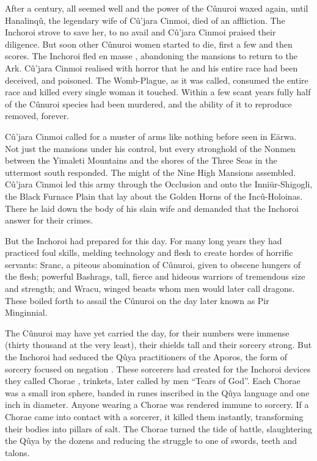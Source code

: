 \documentclass[]{book}
\begin{document}
After a century, all seemed well and the power of the Cûnuroi waxed again, until
Hanalinqû, the legendary wife of Cû'jara Cinmoi, died of an affliction. The Inchoroi
strove to save her, to no avail and Cû'jara Cinmoi praised their diligence. But soon
other Cûnuroi women started to die, first a few and then scores. The Inchoroi fled en
masse , abandoning the mansions to return to the Ark. Cû'jara Cinmoi realised with
horror that he and his entire race had been deceived, and poisoned. The Womb-Plague,
as it was called, consumed the entire race and killed every single woman it touched.
Within a few scant years fully half of the Cûnuroi species had been murdered, and the
ability of it to reproduce removed, forever.

Cû'jara Cinmoi called for a muster of arms like nothing before seen in Eärwa. Not just
the mansions under his control, but every stronghold of the Nonmen between the
Yimaleti Mountains and the shores of the Three Seas in the uttermost south
responded. The might of the Nine High Mansions assembled. Cû'jara Cinmoi led this
army through the Occlusion and onto the Inniür-Shigogli, the Black Furnace Plain that
lay about the Golden Horns of the Incû-Holoinas. There he laid down the body of his
slain wife and demanded that the Inchoroi answer for their crimes.

But the Inchoroi had prepared for this day. For many long years they had practiced foul
skills, melding technology and flesh to create hordes of horrific servants: Sranc, a
piteous abomination of Cûnuroi, given to obscene hungers of the flesh; powerful
Bashrags, tall, fierce and hideous warriors of tremendous size and strength; and Wracu,
winged beasts whom men would later call dragons. These boiled forth to assail the
Cûnuroi on the day later known as Pir Minginnial.

The Cûnuroi may have yet carried the day, for their numbers were immense (thirty
thousand at the very least), their shields tall and their sorcery strong. But the Inchoroi
had seduced the Qûya practitioners of the Aporos, the form of sorcery focused on
negation . These sorcerers had created for the Inchoroi devices they called Chorae ,
trinkets, later called by men ``Tears of God''. Each Chorae was a small iron sphere,
banded in runes inscribed in the Qûya language and one inch in diameter. Anyone
wearing a Chorae was rendered immune to sorcery. If a Chorae came into contact with
a sorcerer, it killed them instantly, transforming their bodies into pillars of salt. The
Chorae turned the tide of battle, slaughtering the Qûya by the dozens and reducing the
struggle to one of swords, teeth and talons.
\end{document}
